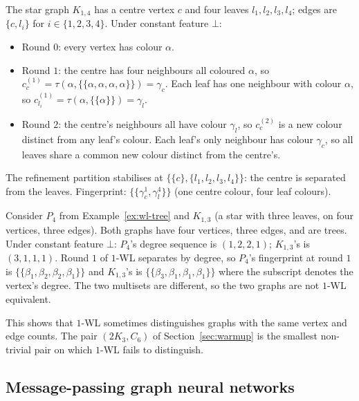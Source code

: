 \begin{example}\label{ex:wl-star}
The star graph $K_{1,4}$ has a centre vertex $c$ and four leaves
$l_1, l_2, l_3, l_4$; edges are $\{c, l_i\}$ for $i \in \{1, 2, 3,
4\}$. Under constant feature $\bot$:
\begin{itemize}
\item Round $0$: every vertex has colour $\alpha$.
\item Round $1$: the centre has four neighbours all coloured
$\alpha$, so $c_c^{(1)} = \tau(\alpha, \{\!\{\alpha, \alpha, \alpha,
\alpha\}\!\}) = \gamma_c$. Each leaf has one neighbour with colour
$\alpha$, so $c_{l_i}^{(1)} = \tau(\alpha, \{\!\{\alpha\}\!\}) =
\gamma_l$.
\item Round $2$: the centre's neighbours all have colour $\gamma_l$,
so $c_c^{(2)}$ is a new colour distinct from any leaf's colour.
Each leaf's only neighbour has colour $\gamma_c$, so all leaves
share a common new colour distinct from the centre's.
\end{itemize}
The refinement partition stabilises at $\{\{c\}, \{l_1, l_2, l_3,
l_4\}\}$: the centre is separated from the leaves. Fingerprint:
$\{\!\{\gamma_c^1, \gamma_l^4\}\!\}$ (one centre colour, four leaf
colours).
\end{example}

\begin{example}\label{ex:wl-distinguish}
Consider $P_4$ from Example~\ref{ex:wl-tree} and $K_{1,3}$ (a star with
three leaves, on four vertices, three edges). Both graphs have four
vertices, three edges, and are trees. Under constant feature $\bot$:
$P_4$'s degree sequence is $(1, 2, 2, 1)$; $K_{1,3}$'s is $(3, 1, 1,
1)$. Round $1$ of $1$-WL separates by degree, so $P_4$'s fingerprint
at round $1$ is $\{\!\{\beta_1, \beta_2, \beta_2, \beta_1\}\!\}$ and
$K_{1,3}$'s is $\{\!\{\beta_3, \beta_1, \beta_1, \beta_1\}\!\}$
where the subscript denotes the vertex's degree. The two multisets
are different, so the two graphs are not $1$-WL equivalent.

This shows that $1$-WL sometimes distinguishes graphs with the same
vertex and edge counts. The pair $(2K_3, C_6)$ of Section~\ref{sec:warmup}
is the smallest non-trivial pair on which $1$-WL fails to
distinguish.
\end{example}

\subsection{Message-passing graph neural networks}\label{sec:mpnn}


